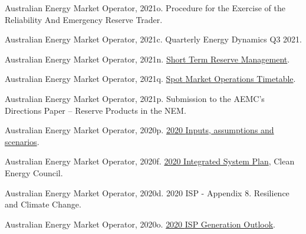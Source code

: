 \documentclass[12pt,a4paper,]{report}
\newlength{\cslhangindent}
\newenvironment{CSLReferences}[2] %
 {%
  \setlength{\parindent}{0pt}
  \ifodd #1 \everypar{\setlength{\hangindent}{\cslhangindent}}\ignorespaces\fi
  \ifnum #2 > 0
  \setlength{\parskip}{#2\baselineskip}
  \fi
 }%
 {}
\begin{document}
\begin{CSLReferences}{1}{0}
\leavevmode{}%
Australian Energy Market Operator, 2021o. Procedure for the {Exercise}
of the {Reliability And Emergency Reserve Trader}.

\leavevmode{}%
Australian Energy Market Operator, 2021c. Quarterly {Energy Dynamics Q3}
2021.

\leavevmode{}%
Australian Energy Market Operator, 2021n.
\href{https://aemo.com.au/-/media/files/electricity/nem/security_and_reliability/power_system_ops/procedures/so_op_3703-short-term-reserve-management.pdf?la=en}{Short
{Term Reserve Management}}.

\leavevmode{}%
Australian Energy Market Operator, 2021q.
\href{https://www.aemo.com.au/-/media/Files/Electricity/NEM/Security_and_Reliability/Dispatch/Spot-Market-Operations-Timetable.pdf}{Spot
{Market Operations Timetable}}.

\leavevmode{}%
Australian Energy Market Operator, 2021p. Submission to the {AEMC}'s
{Directions Paper} -- {Reserve Products} in the {NEM}.

\leavevmode{}%
Australian Energy Market Operator, 2020p.
\href{https://aemo.com.au/-/media/files/electricity/nem/planning_and_forecasting/inputs-assumptions-methodologies/2020/2020-inputs-and-assumptions-workbook-dec20.xlsx?la=en}{2020
{Inputs}, assumptions and scenarios}.

\leavevmode{}%
Australian Energy Market Operator, 2020f.
\href{https://aemo.com.au/energy-systems/major-publications/integrated-system-plan-isp/2020-integrated-system-plan-isp}{2020
{Integrated System Plan}}, Clean Energy Council.

\leavevmode{}%
Australian Energy Market Operator, 2020d. 2020 {ISP} - {Appendix} 8.
{Resilience} and {Climate Change}.

\leavevmode{}%
Australian Energy Market Operator, 2020o.
\href{https://aemo.com.au/-/media/files/major-publications/isp/2020/final-2020-isp-generation-outlook.zip?la=en}{2020
{ISP Generation Outlook}}.


\end{CSLReferences}
\end{document}
